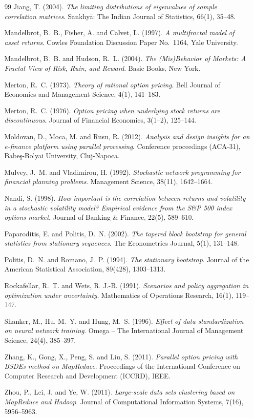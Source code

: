 \documentclass[12pt]{article}
\begin{document}
\begin{thebibliography}{99}
Jiang, T. (2004).
\emph{The limiting distributions of eigenvalues of sample correlation
matrices}.
Sankhy\=a: The Indian Journal of Statistics, 66(1), 35--48.

Mandelbrot, B.~B., Fisher, A. and Calvet, L. (1997).
\emph{A multifractal model of asset returns}.
Cowles Foundation Discussion Paper No.~1164, Yale University.

Mandelbrot, B.~B. and Hudson, R.~L. (2004).
\emph{The (Mis)Behavior of Markets: A Fractal View of Risk, Ruin,
and Reward}.
Basic Books, New York.

Merton, R.~C. (1973).
\emph{Theory of rational option pricing}.
Bell Journal of Economics and Management Science, 4(1), 141--183.

Merton, R.~C. (1976).
\emph{Option pricing when underlying stock returns are discontinuous}.
Journal of Financial Economics, 3(1--2), 125--144.

Moldovan, D., Moca, M. and Rusu, R. (2012).
\emph{Analysis and design insights for an e-finance platform using
parallel processing}.
Conference proceedings (ACA-31), Babe\c{s}-Bolyai University,
Cluj-Napoca.

Mulvey, J.~M. and Vladimirou, H. (1992).
\emph{Stochastic network programming for financial planning problems}.
Management Science, 38(11), 1642--1664.

Nandi, S. (1998).
\emph{How important is the correlation between returns and volatility
in a stochastic volatility model? Empirical evidence from the S\&P 500
index options market}.
Journal of Banking \& Finance, 22(5), 589--610.

Paparoditis, E. and Politis, D.~N. (2002).
\emph{The tapered block bootstrap for general statistics from
stationary sequences}.
The Econometrics Journal, 5(1), 131--148.

Politis, D.~N. and Romano, J.~P. (1994).
\emph{The stationary bootstrap}.
Journal of the American Statistical Association, 89(428), 1303--1313.

Rockafellar, R.~T. and Wets, R. J.-B. (1991).
\emph{Scenarios and policy aggregation in optimization under
uncertainty}.
Mathematics of Operations Research, 16(1), 119--147.

Shanker, M., Hu, M.~Y. and Hung, M.~S. (1996).
\emph{Effect of data standardization on neural network training}.
Omega -- The International Journal of Management Science, 24(4),
385--397.

Zhang, K., Gong, X., Peng, S. and Liu, S. (2011).
\emph{Parallel option pricing with BSDEs method on MapReduce}.
Proceedings of the International Conference on Computer Research and
Development (ICCRD), IEEE.

Zhou, P., Lei, J. and Ye, W. (2011).
\emph{Large-scale data sets clustering based on MapReduce and Hadoop}.
Journal of Computational Information Systems, 7(16), 5956--5963.

\end{thebibliography}
\end{document}
